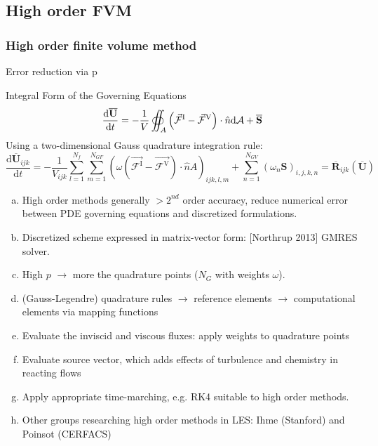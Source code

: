 \documentclass{beamer}
\begin{document}
\subsection{High order FVM}
\begin{frame}%
\frametitle{High order finite volume method}
\begin{minipage}[t][1\textheight]{1\textwidth}
\vspace{-20pt}
\begin{exampleblock}{Error reduction via p}
\tiny
\begin{block}{Integral Form of the Governing Equations}
     \[
      \frac{\mathrm{d}\overline{\mathbf{U}}}{\mathrm{d}t} = 
      - \frac{1}{V} \oiint_A \left( \vec{\mathcal{F}}^{\rm I} - 
      \vec{\mathcal{F}}^{\rm V} \right) \cdot \hat{n} \mathrm{d}\mathcal{A} + 
      \overline{\mathbf{S}}
     \] 
    Using a two-dimensional Gauss quadrature integration rule:
    \[  \frac{\mathrm{d}\overline{\mathbf{U}}_{ijk}}{\mathrm{d}t} = -
       \frac{1}{{V}_{ijk}} \sum_{l=1}^{N_f}     
      \sum_{m=1}^{N_{GF}} \left( \omega \left(\vec{\mathcal{F}^{\mathrm{I}}} - 
      \vec{\mathcal{F}^{\mathrm{V}}} \right)\cdot \hat{n} {A} \right)_{ijk,l,m} 
      + \sum_{n=1}^{N_{GV}} \left( \omega_n {\mathbf{S}} \right)_{i,j,k,n}      
       = \overline{\mathbf{R}}_{ijk}  \left( \overline{\mathbf{U}} \right) \]
 
\end{block}

\begin{enumerate}[(a)]
\tiny
\item High order methods  generally $ > 2^{nd}$ order accuracy, reduce numerical error between PDE governing equations and discretized formulations.
\item Discretized scheme expressed in matrix-vector form: [Northrup 2013] GMRES solver.\item High $p$ $\rightarrow$ more the quadrature points ($ N_G $ with weights $ \omega $).
\item (Gauss-Legendre) quadrature rules $\rightarrow$ reference elements $\rightarrow$ computational elements via mapping functions
\item Evaluate the inviscid and viscous fluxes: apply weights to quadrature points
\item Evaluate source vector, which adds effects of turbulence and chemistry in reacting flows
\item Apply appropriate time-marching, e.g. RK4 suitable to high order methods.
\item Other groups researching high order methods in LES: Ihme (Stanford) and Poinsot (CERFACS)
\end{enumerate}
\end{exampleblock}
\end{minipage}


\end{frame}
\end{document}
